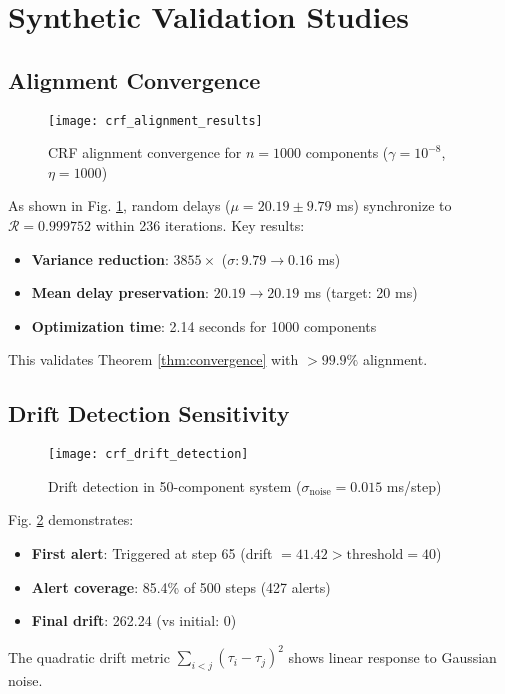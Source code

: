 \section{Synthetic Validation Studies}
\label{sec:simulations}

\subsection{Alignment Convergence}
\begin{figure}[h]
  \centering
  \texttt{[image: crf\_alignment\_results]}
  \caption{CRF alignment convergence for $n=1000$ components ($\gamma=10^{-8}$, $\eta=1000$)}
  \label{fig:convergence}
\end{figure}
As shown in Fig. \ref{fig:convergence}, random delays ($\mu=20.19 \pm 9.79$ ms) synchronize to $\mathcal{R}=0.999752$ within 236 iterations. Key results:
\begin{itemize}
  \item \textbf{Variance reduction}: $3855\times$ ($\sigma: 9.79 \rightarrow 0.16$ ms)
  \item \textbf{Mean delay preservation}: $20.19 \rightarrow 20.19$ ms (target: 20 ms)
  \item \textbf{Optimization time}: 2.14 seconds for 1000 components
\end{itemize}
This validates Theorem \ref{thm:convergence} with $>99.9\%$ alignment.

\subsection{Drift Detection Sensitivity}
\begin{figure}[h]
  \centering
  \texttt{[image: crf\_drift\_detection]}
  \caption{Drift detection in 50-component system ($\sigma_{\text{noise}}=0.015$ ms/step)}
  \label{fig:drift}
\end{figure}
Fig. \ref{fig:drift} demonstrates:
\begin{itemize}
  \item \textbf{First alert}: Triggered at step 65 (drift $=41.42 > \text{threshold}=40$)
  \item \textbf{Alert coverage}: 85.4\% of 500 steps (427 alerts)
  \item \textbf{Final drift}: 262.24 (vs initial: 0)
\end{itemize}
The quadratic drift metric $\sum_{i<j}(\tau_i - \tau_j)^2$ shows linear response to Gaussian noise.

